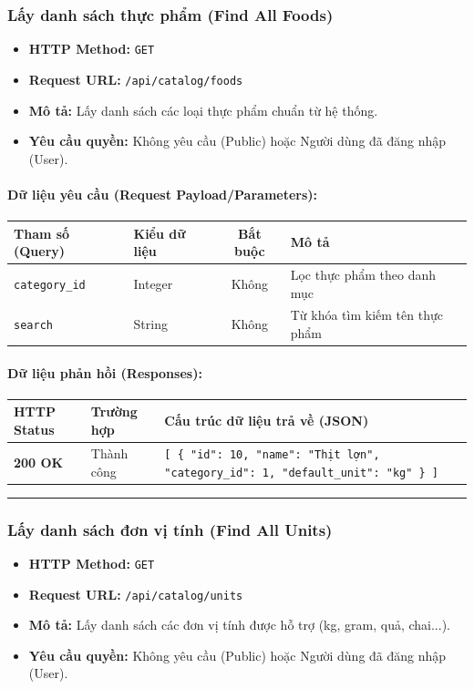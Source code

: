 \documentclass[12pt,a4paper]{article}
\begin{document}
\subsubsection{Lấy danh sách thực phẩm (Find All Foods)}
\begin{itemize}[leftmargin=*]
    \item \textbf{HTTP Method:} \texttt{GET}
    \item \textbf{Request URL:} \texttt{/api/catalog/foods}
    \item \textbf{Mô tả:} Lấy danh sách các loại thực phẩm chuẩn từ hệ thống.
    \item \textbf{Yêu cầu quyền:} Không yêu cầu (Public) hoặc Người dùng đã đăng nhập (User).
\end{itemize}

\paragraph{Dữ liệu yêu cầu (Request Payload/Parameters):}
\begin{longtable}{|p{2.8cm}|p{2.2cm}|c|p{7.0cm}|}
\hline
\textbf{Tham số (Query)} & \textbf{Kiểu dữ liệu} & \textbf{Bắt buộc} & \textbf{Mô tả} \\ \hline
\endhead
\texttt{category\_id} & Integer & Không & Lọc thực phẩm theo danh mục \\ \hline
\texttt{search} & String & Không & Từ khóa tìm kiếm tên thực phẩm \\ \hline
\end{longtable}

\paragraph{Dữ liệu phản hồi (Responses):}
\begin{longtable}{|p{2.8cm}|p{3.2cm}|p{8.0cm}|}
\hline
\textbf{HTTP Status} & \textbf{Trường hợp} & \textbf{Cấu trúc dữ liệu trả về (JSON)} \\ \hline
\endhead
\textbf{200 OK} & Thành công & \texttt{[ \{ "id": 10, "name": "Thịt lợn", "category\_id": 1, "default\_unit": "kg" \} ]} \\ \hline
\end{longtable}

\vskip 0.4cm
\noindent\rule{\textwidth}{0.3pt}
\vskip 0.4cm

\subsubsection{Lấy danh sách đơn vị tính (Find All Units)}
\begin{itemize}[leftmargin=*]
    \item \textbf{HTTP Method:} \texttt{GET}
    \item \textbf{Request URL:} \texttt{/api/catalog/units}
    \item \textbf{Mô tả:} Lấy danh sách các đơn vị tính được hỗ trợ (kg, gram, quả, chai...).
    \item \textbf{Yêu cầu quyền:} Không yêu cầu (Public) hoặc Người dùng đã đăng nhập (User).
\end{itemize}
\end{document}
